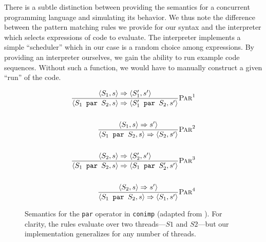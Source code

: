 There is a subtle distinction between providing the semantics for a concurrent programming language and simulating its behavior.  We thus note the difference between the pattern matching rules we provide for our syntax and the interpreter which selects expressions of code to evaluate.  The interpreter implements a simple ``scheduler'' which in our case is a random choice among expressions.  By providing an interpreter ourselves, we gain the ability to run example code sequences.  Without such a function, we would have to manually construct a given ``run'' of the code.

\begin{figure}[!h]
\begin{align*}
\frac{\langle S_1 , s \rangle \Rightarrow \langle S_1' , s' \rangle}
	 {\langle S_1 \texttt{ par } S_2, s \rangle \Rightarrow \langle S_1' \texttt{ par } S_2, s' \rangle}
	 \textsc{Par}^1 
\\
\\
\frac{\langle S_1 , s \rangle \Rightarrow s' \rangle}
     {\langle S_1 \texttt{ par } S_2, s \rangle \Rightarrow \langle S_2, s' \rangle}  
	 \textsc{Par}^2
\\
\\
\frac{\langle S_2 , s \rangle \Rightarrow \langle S_2' , s' \rangle}
	 {\langle S_1 \texttt{ par } S_2, s \rangle \Rightarrow \langle S_1 \texttt{ par } S_2', s' \rangle}
	 \textsc{Par}^3 
\\
\\
\frac{\langle S_2 , s \rangle \Rightarrow s' \rangle}
     {\langle S_1 \texttt{ par } S_2, s \rangle \Rightarrow \langle S_1, s' \rangle}  
	 \textsc{Par}^4
\end{align*}
\caption{Semantics for the \texttt{par} operator in \texttt{conimp} (adapted from \cite{huttel2010}). For clarity, the rules evaluate over two threads---$S1$ and $S2$---but our implementation generalizes for any number of threads.
}
\label{fig:par-rules}
\end{figure}

